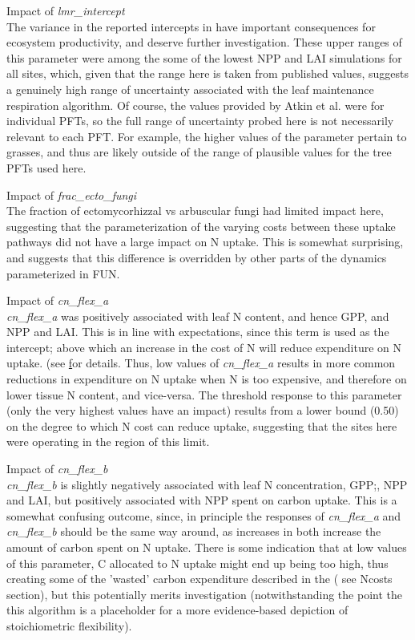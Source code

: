 \documentclass[draft,linenumbers]{agujournal}
\begin{document}
Impact of \emph{lmr\_intercept}\\
The variance in the reported intercepts in \cite{atkin2016} have important consequences for ecosystem productivity, and deserve further investigation. These upper ranges of this parameter were among the some of the lowest NPP and LAI simulations for all sites, which, given that the range here is taken from published values, suggests a genuinely high range of uncertainty associated with the leaf maintenance respiration algorithm. Of course, the values provided by Atkin et al. were for individual PFTs, so the full range of uncertainty probed here is not necessarily relevant to each PFT. For example, the higher values of the parameter pertain to grasses, and thus are likely outside of the range of plausible values for the tree PFTs used here. 

Impact of \emph{frac\_ecto\_fungi}\\
The fraction of ectomycorhizzal vs arbuscular fungi had limited impact here, suggesting that the parameterization of the varying costs between these uptake pathways did not have a large impact on N uptake. This is somewhat surprising, and suggests that this difference is overridden by other parts of the dynamics parameterized in FUN.

Impact of \emph{cn\_flex\_a}\\
\emph{cn\_flex\_a} was positively associated with leaf N content, and hence GPP, and NPP and LAI. This is in line with expectations, since this term is used as the intercept; above which an increase in the cost of N will reduce expenditure on N uptake.  (see \href{https://escomp.github.io/ctsm-docs/doc/build/html/tech_note/FUN/CLM50_Tech_Note_FUN.html#modifications-to-allow-variation-in-c-n-ratios} for details. Thus, low values of \emph{cn\_flex\_a}  results in more common reductions in expenditure on N uptake when N is too expensive, and therefore on lower tissue N content, and vice-versa.  The threshold response to this parameter (only the very highest values have an impact) results from a lower bound (0.50) on the degree to which N cost can reduce uptake, suggesting that the sites here were operating in the region of this limit. 

Impact of \emph{cn\_flex\_b}\\
\emph{cn\_flex\_b} is slightly negatively associated with leaf N concentration, GPP;, NPP and LAI, but positively associated with NPP spent on carbon uptake. This is a somewhat confusing outcome, since, in principle the responses of \emph{cn\_flex\_a} and \emph{cn\_flex\_b} should be the same way around, as increases in both increase the amount of carbon spent on N uptake. There is some indication that at low values of this parameter, C allocated to N uptake might end up being too high, thus creating some of the 'wasted' carbon expenditure described in the ( see Ncosts section), but this potentially merits investigation (notwithstanding the point the this algorithm is a placeholder for a more evidence-based depiction of stoichiometric flexibility). 
\end{document}
